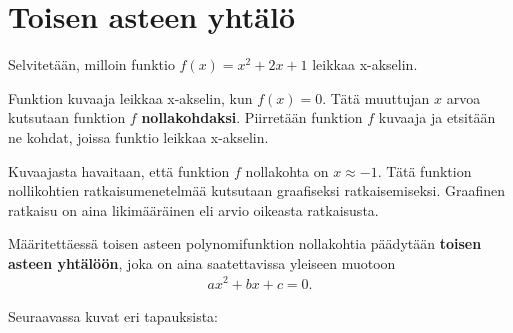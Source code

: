 \section{Toisen asteen yhtälö}


\begin{esimerkki}
Selvitetään, milloin funktio $f(x)=x^2+2x+1$ leikkaa x-akselin.

Funktion kuvaaja leikkaa x-akselin, kun $f(x)=0$. Tätä muuttujan $x$ arvoa kutsutaan funktion $f$ \textbf{nollakohdaksi}. Piirretään funktion $f$ kuvaaja ja etsitään ne kohdat, joissa funktio leikkaa x-akselin. %

\begin{kuvaajapohja}{1.5}{-2.5}{0.5}{-0.5}{3}
\end{kuvaajapohja}
\end{esimerkki}

Kuvaajasta havaitaan, että funktion $f$ nollakohta on $x \approx -1$. Tätä funktion nollikohtien ratkaisumenetelmää kutsutaan graafiseksi ratkaisemiseksi. Graafinen ratkaisu on aina likimääräinen eli arvio oikeasta ratkaisusta.

Määritettäessä toisen asteen polynomifunktion nollakohtia päädytään \textbf{toisen asteen yhtälöön}, joka on aina saatettavissa yleiseen muotoon
\begin{align*}
ax^2+bx+c=0.
\end{align*}

Seuraavassa kuvat eri tapauksista:


